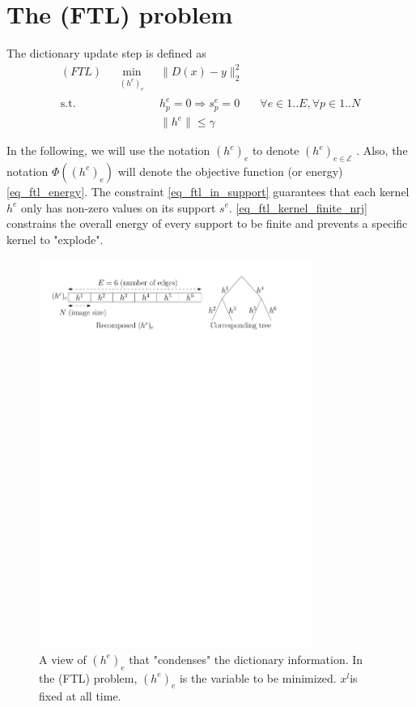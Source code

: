 \section{The (FTL) problem}

The dictionary update step is defined as 
\begin{align}
(FTL) \quad \underset{\substack{(h^\text{e})_{e}}}\min & \lVert D(x) - y \rVert_2^2 \label{eq_ftl_energy}\\
\text{s.t. } & h^e_p = 0 \Rightarrow  s^e_p=0 \quad & \forall e \in 1..E, \forall p \in 1..N \label{eq_ftl_in_support} \\
 & \lVert h^e \rVert \le \gamma \label{eq_ftl_kernel_finite_nrj}
\end{align}

In the following, we will use the notation $(h^e)_{e}$ to denote $(h^e)_{e \in \mathcal{E}}$ . Also, the notation $\Phi((h^e)_{e})$ will denote the objective function (or energy) \ref{eq_ftl_energy}.
The constraint \ref{eq_ftl_in_support} guarantees that each kernel $h^e$ only has non-zero values on its support $s^e$. \ref{eq_ftl_kernel_finite_nrj} constrains the overall energy of every support to be finite and prevents a specific kernel to "explode".

\begin{figure}[!ht] \centering
\includegraphics[width=0.8\textwidth]{figures/hk_tree.pdf}
\caption{A view of $(h^e)_e$ that "condenses" the dictionary information. In the (FTL) problem, $(h^e)_e$ is the variable to be minimized. $x^l$is fixed at all time.}\label{fig_hk_tree}
\end{figure}

